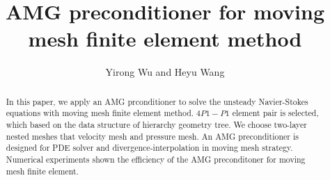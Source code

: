 \documentclass{eajam}
\begin{document}

\title{AMG preconditioner for moving mesh finite element method}


%
%
%
\author[Yirong Wu and Heyu Wang]{Yirong Wu and Heyu Wang\corrauth}
\address{School of Mathematical Science, ZheJiang University, HangZhou,
  310027, China}


\begin{abstract}
    In this paper, we apply an AMG prconditioner to solve
    the unsteady Navier-Stokes equations with moving mesh finite
    element method. $4P1-P1$ element pair is selected, which based on
    the data structure of hierarchy geometry tree. We choose two-layer nested
    meshes that velocity mesh and pressure mesh. An AMG preconditioner
    is designed for PDE solver and divergence-interpolation in moving
    mesh strategy. Numerical experiments shown the efficiency of the
    AMG preconditoner for moving mesh finite element. \\
\end{abstract}


\maketitle
\end{document}
